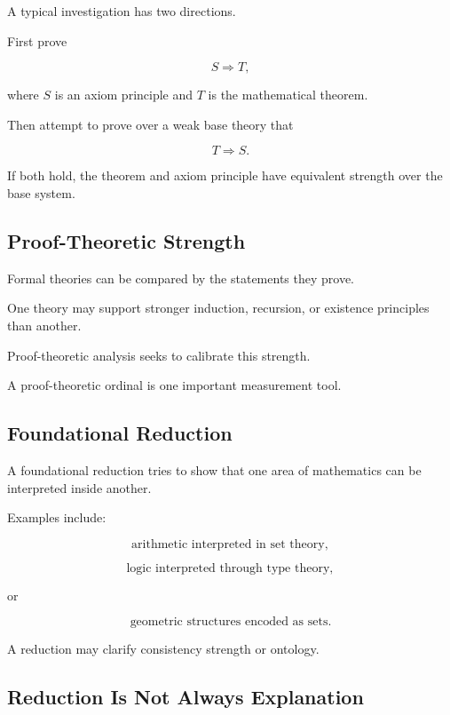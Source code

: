 A typical investigation has two directions.

First prove

\[
\boxed{
S
\Longrightarrow
T,
}
\]

where \(S\) is an axiom principle and \(T\) is the mathematical theorem.

Then attempt to prove over a weak base theory that

\[
\boxed{
T
\Longrightarrow
S.
}
\]

If both hold, the theorem and axiom principle have equivalent strength over
the base system.

\subsection{Proof-Theoretic Strength}
\label{subsec:foundational-proof-theoretic-strength}

Formal theories can be compared by the statements they prove.

One theory may support stronger induction, recursion, or existence
principles than another.

Proof-theoretic analysis seeks to calibrate this strength.

A proof-theoretic ordinal is one important measurement tool.

\subsection{Foundational Reduction}
\label{subsec:foundational-reduction}

A foundational reduction tries to show that one area of mathematics can be
interpreted inside another.

Examples include:

\[
\boxed{
\text{arithmetic interpreted in set theory},
}
\]

\[
\boxed{
\text{logic interpreted through type theory},
}
\]

or

\[
\boxed{
\text{geometric structures encoded as sets}.
}
\]

A reduction may clarify consistency strength or ontology.

\subsection{Reduction Is Not Always Explanation}
\label{subsec:reduction-not-explanation}

